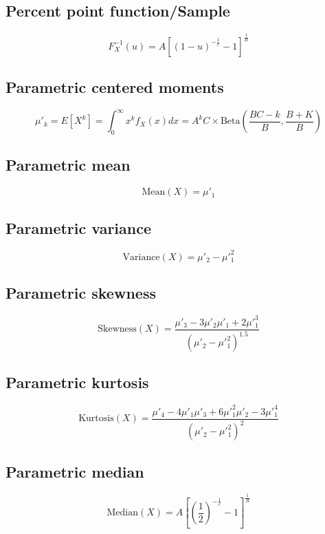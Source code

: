\documentclass{article}
\begin{document}
\subsection{Percent point function/Sample}
\begin{equation*} F^{-1}_{X}\left(u\right)=A\left[(1-u)^{-\frac{1}{c}}-1\right]^{\frac{1}{B}} \end{equation*}
\subsection{Parametric centered moments}
\begin{equation*} \mu'_{k}=E[X^k]=\int_{0}^{\infty}x^{k}f_{X}\left(x\right)dx=A^{k}C\times \text{Beta}\left(\frac{BC-k}{B},\frac{B+K}{B}\right) \end{equation*}
\subsection{Parametric mean}
\begin{equation*} \mathrm{Mean}(X)=\mu'_{1} \end{equation*}
\subsection{Parametric variance}
\begin{equation*} \mathrm{Variance}(X)=\mu'_{2}-\mu'^{2}_{1} \end{equation*}
\subsection{Parametric skewness}
\begin{equation*} \mathrm{Skewness}(X)=\frac{\mu'_{3}-3\mu'_{2}\mu'_{1}+2\mu'^{3}_{1}}{(\mu'_{2}-\mu'^{2}_{1})^{1.5}} \end{equation*}
\subsection{Parametric kurtosis}
\begin{equation*} \mathrm{Kurtosis}(X)=\frac{\mu'_{4}-4\mu'_{1}\mu'_{3}+6\mu'^{2}_{1}\mu'_{2}-3\mu'^{4}_{1}}{(\mu'_{2}-\mu'^{2}_{1})^{2}} \end{equation*}
\subsection{Parametric median}
\begin{equation*} \mathrm{Median}(X)=A\left[\left(\frac{1}{2}\right)^{-\frac{1}{c}}-1\right]^{\frac{1}{B}} \end{equation*}
\end{document}
